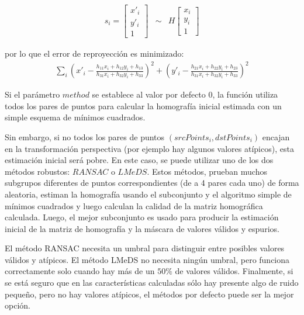 \begin{eqnarray*}
s_{i}=\left[\begin{array}{c}
x'_{i}\\
y'_{i}\\
1
\end{array}\right] & \sim & H\left[\begin{array}{c}
x_{i}\\
y_{i}\\
1
\end{array}\right]
\end{eqnarray*}
 
por lo que el error de reproyección es minimizado:
\begin{eqnarray*}
\underset{i}{\sum}\left(x'_{i}-\frac{h_{11}x_{i}+h_{12}y_{i}+h_{13}}{h_{31}x_{i}+h_{32}y_{i}+h_{33}}\right)^{2}+\left(y'_{i}-\frac{h_{21}x_{i}+h_{22}y_{i}+h_{23}}{h_{31}x_{i}+h_{32}y_{i}+h_{33}}\right)^{2}
\end{eqnarray*}

Si el parámetro $method$ se establece al valor por defecto $0$, la función utiliza todos los pares de puntos para calcular la homografía inicial estimada con un simple esquema de mínimos cuadrados. 

Sin embargo, si no todos los pares de puntos $(srcPoints_{i}, dstPoints_{i})$ encajan en la transformación perspectiva (por ejemplo hay algunos valores atípicos), esta estimación inicial será pobre. En este caso, se puede utilizar uno de los dos métodos robustos: $RANSAC$ o $LMeDS$. Estos métodos, prueban muchos subgrupos diferentes de puntos correspondientes (de a 4 pares cada uno) de forma aleatoria, estiman la homografía usando el subconjunto y el algoritmo simple de mínimos cuadrados y luego calculan la calidad  de la matriz homográfica calculada.
Luego, el mejor subconjunto es usado para producir la estimación inicial de la matriz de homografía y la máscara de valores válidos y espurios.


El método RANSAC 
necesita un umbral para distinguir entre posibles valores válidos y atípicos. El método LMeDS no necesita ningún umbral, pero funciona correctamente solo cuando hay más de un $50\%$ de valores válidos. Finalmente, si se está seguro que en las características calculadas sólo hay presente algo de ruido pequeño, pero no hay valores atípicos, el métodos por defecto puede ser la mejor opción.

